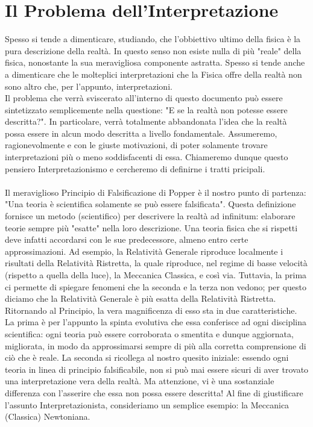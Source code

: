 \documentclass[]{scrbook}
\begin{document}
	\section{Il Problema dell'Interpretazione}
	Spesso si tende a dimenticare, studiando, che l'obbiettivo ultimo della fisica è la pura descrizione della realtà. In questo senso non esiste nulla di più "reale" della fisica, nonostante la sua meravigliosa componente astratta. Spesso si tende anche a dimenticare che le molteplici interpretazioni che la Fisica offre della realtà non sono altro che, per l'appunto, interpretazioni.  
	\\
	Il problema che verrà sviscerato all'interno di questo documento può essere sintetizzato semplicemente nella questione: "E se la realtà non potesse essere descritta?". In particolare, verrà totalmente abbandonata l'idea che la realtà possa essere in alcun modo descritta a livello fondamentale. Assumeremo, ragionevolmente e con le giuste motivazioni, di poter solamente trovare interpretazioni più o meno soddisfacenti di essa. Chiameremo dunque questo pensiero Interpretazionismo e cercheremo di definirne i tratti pricipali.\\
		\\
	Il meraviglioso Principio di Falsificazione di Popper è il nostro punto di partenza: "Una teoria è scientifica solamente se può essere falsificata". Questa definizione fornisce un metodo (scientifico) per descrivere la realtà ad infinitum: elaborare teorie sempre più "esatte" nella loro descrizione. Una teoria fisica che si rispetti deve infatti accordarsi con le sue predecessore, almeno entro certe approssimazioni. Ad esempio, la Relatività Generale riproduce localmente i risultati della Relatività Ristretta, la quale riproduce, nel regime di basse velocità (rispetto a quella della luce), la Meccanica Classica, e così via. Tuttavia, la prima ci permette di spiegare fenomeni che la seconda e la terza non vedono; per questo diciamo che la Relatività Generale è più esatta della Relatività Ristretta. \\
	Ritornando al Principio, la vera magnificenza di esso sta in due caratteristiche. La prima è per l'appunto la spinta evolutiva che essa conferisce ad ogni disciplina scientifica: ogni teoria può essere corroborata o smentita e dunque aggiornata, migliorata, in modo da approssimarsi sempre di più alla corretta comprensione di ciò che è reale. La seconda si ricollega al nostro quesito iniziale: essendo ogni teoria in linea di principio falsificabile, non si può mai essere sicuri di aver trovato una interpretazione vera della realtà. Ma attenzione, vi è una sostanziale differenza con l'asserire che essa non possa essere descritta! Al fine di giustificare l'assunto Interpretazionista, consideriamo un semplice esempio: la Meccanica (Classica) Newtoniana.\\
\end{document}
